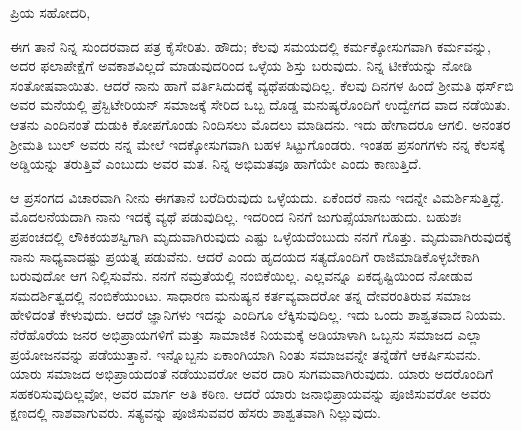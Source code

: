 \noindent
ಪ್ರಿಯ ಸಹೋದರಿ,

ಈಗ ತಾನೆ ನಿನ್ನ ಸುಂದರವಾದ ಪತ್ರ ಕೈಸೇರಿತು. ಹೌದು; ಕೆಲವು ಸಮಯದಲ್ಲಿ ಕರ್ಮಕ್ಕೋಸುಗವಾಗಿ ಕರ್ಮವನ್ನು, ಅದರ ಫಲಾಪೇಕ್ಷೆಗೆ ಅವಕಾಶವಿಲ್ಲದೆ ಮಾಡುವುದರಿಂದ ಒಳ್ಳೆಯ ಶಿಸ್ತು ಬರುವುದು. ನಿನ್ನ ಟೀಕೆಯನ್ನು ನೋಡಿ ಸಂತೋಷವಾಯಿತು. ಆದರೆ ನಾನು ಹಾಗೆ ವರ್ತಿಸಿದುದಕ್ಕೆ ವ್ಯಥೆಪಡುವುದಿಲ್ಲ. ಕೆಲವು ದಿನಗಳ ಹಿಂದೆ ಶ‍್ರೀಮತಿ ಥರ್ಸ್‌ಬಿ ಅವರ ಮನೆಯಲ್ಲಿ ಪ್ರೆಸ್ಬಿಟೇರಿಯನ್ ಸಮಾಜಕ್ಕೆ ಸೇರಿದ ಒಬ್ಬ ದೊಡ್ಡ ಮನುಷ್ಯರೊಂದಿಗೆ ಉದ್ವೇಗದ ವಾದ ನಡೆಯಿತು. ಆತನು ಎಂದಿನಂತೆ ದುಡುಕಿ ಕೋಪಗೊಂಡು ನಿಂದಿಸಲು ಮೊದಲು ಮಾಡಿದನು. ಇದು ಹೇಗಾದರೂ ಆಗಲಿ. ಅನಂತರ ಶ‍್ರೀಮತಿ ಬುಲ್ ಅವರು ನನ್ನ ಮೇಲೆ ಇದಕ್ಕೋಸುಗವಾಗಿ ಬಹಳ ಸಿಟ್ಟುಗೊಂಡರು. ಇಂತಹ ಪ್ರಸಂಗಗಳು ನನ್ನ ಕೆಲಸಕ್ಕೆ ಅಡ್ಡಿಯನ್ನು ತರುತ್ತಿವೆ ಎಂಬುದು ಅವರ ಮತ. ನಿನ್ನ ಅಭಿಮತವೂ ಹಾಗೆಯೇ ಎಂದು ಕಾಣುತ್ತಿದೆ.

ಆ ಪ್ರಸಂಗದ ವಿಚಾರವಾಗಿ ನೀನು ಈಗತಾನೆ ಬರೆದಿರುವುದು ಒಳ್ಳೆಯದು. ಏಕೆಂದರೆ ನಾನು ಇದನ್ನೇ ವಿಮರ್ಶಿಸುತ್ತಿದ್ದೆ. ಮೊದಲನೆಯದಾಗಿ ನಾನು ಇದಕ್ಕೆ ವ್ಯಥೆ ಪಡುವುದಿಲ್ಲ. ಇದರಿಂದ ನಿನಗೆ ಜುಗುಪ್ಸೆಯಾಗಬಹುದು. ಬಹುಶಃ ಪ್ರಪಂಚದಲ್ಲಿ ಲೌಕಿಕ\break ಯಶಸ್ವಿಗಾಗಿ ಮೃದುವಾಗಿರುವುದು ಎಷ್ಟು ಒಳ್ಳೆಯದೆಂಬುದು ನನಗೆ ಗೊತ್ತು. ಮೃದುವಾಗಿರುವುದಕ್ಕೆ ನಾನು ಸಾಧ್ಯವಾದಷ್ಟು ಪ್ರಯತ್ನ ಪಡುವೆನು. ಆದರೆ ಎಂದು ಹೃದಯದ ಸತ್ಯದೊಂದಿಗೆ ರಾಜಿಮಾಡಿಕೊಳ್ಳಬೇಕಾಗಿ ಬರುವುದೋ ಆಗ ನಿಲ್ಲಿಸುವೆನು. ನನಗೆ ನಮ್ರತೆಯಲ್ಲಿ ನಂಬಿಕೆಯಿಲ್ಲ. ಎಲ್ಲವನ್ನೂ ಏಕದೃಷ್ಟಿಯಿಂದ ನೋಡುವ ಸಮದರ್ಶಿತ್ವದಲ್ಲಿ ನಂಬಿಕೆಯುಂಟು. ಸಾಧಾರಣ ಮನುಷ್ಯನ ಕರ್ತವ್ಯವಾದರೋ ತನ್ನ ದೇವರಂತಿರುವ ಸಮಾಜ ಹೇಳಿದಂತೆ ಕೇಳುವುದು. ಆದರೆ ಜ್ಞಾನಿಗಳು ಇದನ್ನು ಎಂದಿಗೂ ಲೆಕ್ಕಿಸುವುದಿಲ್ಲ. ಇದು ಒಂದು ಶಾಶ್ವತವಾದ ನಿಯಮ. ನೆರೆಹೊರೆಯ ಜನರ ಅಭಿಪ್ರಾಯಗಳಿಗೆ ಮತ್ತು ಸಾಮಾಜಿಕ ನಿಯಮಕ್ಕೆ ಅಡಿಯಾಳಾಗಿ ಒಬ್ಬನು ಸಮಾಜದ ಎಲ್ಲಾ ಪ್ರಯೋಜನವನ್ನು ಪಡೆಯುತ್ತಾನೆ. ಇನ್ನೊಬ್ಬನು ಏಕಾಂಗಿಯಾಗಿ ನಿಂತು ಸಮಾಜವನ್ನೇ ತನ್ನೆಡೆಗೆ ಆಕರ್ಷಿಸುವನು. ಯಾರು ಸಮಾಜದ ಅಭಿಪ್ರಾಯದಂತೆ ನಡೆಯುವರೋ ಅವರ ದಾರಿ ಸುಗಮವಾಗಿರುವುದು. ಯಾರು ಅದರೊಂದಿಗೆ ಸಹಕರಿಸುವುದಿಲ್ಲವೋ, ಅವರ ಮಾರ್ಗ ಅತಿ ಕಠಿಣ. ಆದರೆ ಯಾರು ಜನಾಭಿಪ್ರಾಯವನ್ನು ಪೂಜಿಸುವರೋ ಅವರು ಕ್ಷಣದಲ್ಲಿ ನಾಶವಾಗುವರು. ಸತ್ಯವನ್ನು ಪೂಜಿಸುವವರ ಹೆಸರು ಶಾಶ್ವತವಾಗಿ ನಿಲ್ಲುವುದು.

\vspace{0.1cm}

